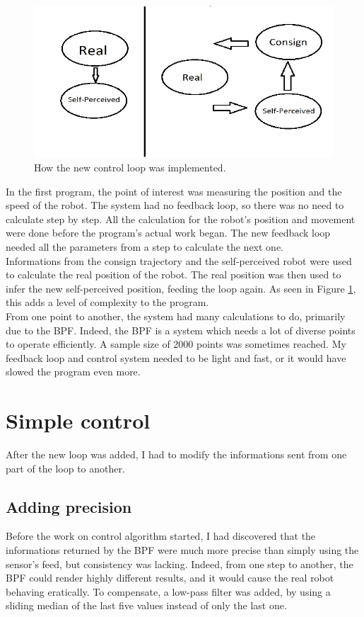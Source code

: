 \begin{figure}[ht]
\centering
\includegraphics{Figures/Loops}
\decoRule
\caption[Direct and controled loops]{How the new control loop was implemented.}
\label{fig:Loops}
\end{figure}

In the first program, the point of interest was measuring the position and the speed of the robot.
The system had no feedback loop, so there was no need to calculate step by step. All the calculation for the robot's position and movement were done before the program's actual work began.
The new feedback loop needed all the parameters from a step to calculate the next one.\\

Informations from the consign trajectory and the self-perceived robot were used to calculate the real position of the robot.
The real position was then used to infer the new self-perceived position, feeding the loop again.
As seen in Figure \ref{fig:Loops}, this adds a level of complexity to the program.\\

From one point to another, the system had many calculations to do, primarily due to the BPF.
Indeed, the BPF is a system which needs a lot of diverse points to operate efficiently. A sample size of 2000 points was sometimes reached.
My feedback loop and control system needed to be light and fast, or it would have slowed the program even more.\\


\section{Simple control}
After the new loop was added, I had to modify the informations sent from one part of the loop to another.

\subsection{Adding precision}
Before the work on control algorithm started, I had discovered that the informations returned by the BPF were much more precise than simply using the sensor's feed, but consistency was lacking.
Indeed, from one step to another, the BPF could render highly different results, and it would cause the real robot behaving eratically.
To compensate, a low-pass filter was added, by using a sliding median of the last five values instead of only the last one.\\

